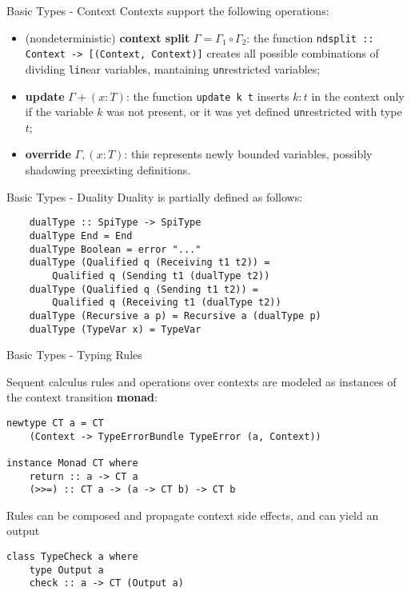 \begin{frame}[fragile]{Basic Types - Context}
    Contexts support the following operations:
    \begin{itemize}
        \item (nondeterministic) \textbf{context split} $\Gamma = \Gamma_1 \circ \Gamma_2$: the function \texttt{ndsplit :: Context -> [(Context, Context)]} creates all possible combinations of dividing \texttt{lin}ear variables, mantaining \texttt{un}restricted variables;
        \item \textbf{update} $\Gamma + (x : T)$: the function \texttt{update k t} inserts $k : t$ in the context only if the variable $k$ was not present, or it was yet defined \texttt{un}restricted with type $t$;
        \item \textbf{override} $\Gamma, (x : T)$: this represents newly bounded variables, possibly shadowing preexisting definitions.
    \end{itemize}
\end{frame}

\begin{frame}[fragile]{Basic Types - Duality}
    Duality is partially defined as follows:
    \begin{verbatim}
    dualType :: SpiType -> SpiType
    dualType End = End
    dualType Boolean = error "..."
    dualType (Qualified q (Receiving t1 t2)) = 
        Qualified q (Sending t1 (dualType t2))
    dualType (Qualified q (Sending t1 t2)) = 
        Qualified q (Receiving t1 (dualType t2))
    dualType (Recursive a p) = Recursive a (dualType p)
    dualType (TypeVar x) = TypeVar 
    \end{verbatim}
\end{frame}

\begin{frame}[fragile]{Basic Types - Typing Rules}

    Sequent calculus rules and operations over contexts are modeled as instances of the context transition \textbf{monad}:

    \begin{verbatim}
newtype CT a = CT 
    (Context -> TypeErrorBundle TypeError (a, Context))

instance Monad CT where
    return :: a -> CT a
    (>>=) :: CT a -> (a -> CT b) -> CT b
\end{verbatim}
    Rules can be composed and propagate context side effects, and can yield an output

    \begin{verbatim}
class TypeCheck a where
    type Output a
    check :: a -> CT (Output a)
    \end{verbatim}
\end{frame}

